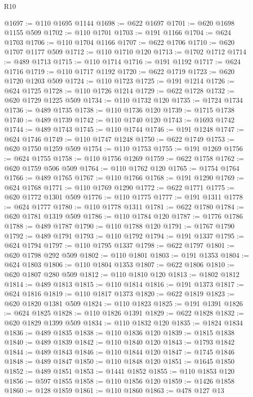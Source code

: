 \begin{lexlean}{R10}
\begin{coremodule}
@1697 := @110 @1695 @1144
@1698 := @622 @1697
@1701 := @620 @1698 @1155 @509
@1702 := @110 @1701
@1703 := @191 @1166
@1704 := @624 @1703
@1706 := @110 @1704 @1166
@1707 := @622 @1706
@1710 := @620 @1707 @1177 @509
@1712 := @110 @1710 @120
@1713 := @1702 @1712
@1714 := @489 @1713
@1715 := @110 @1714
@1716 := @191 @1192
@1717 := @624 @1716
@1719 := @110 @1717 @1192
@1720 := @622 @1719
@1723 := @620 @1720 @1203 @509
@1724 := @110 @1723
@1725 := @191 @1214
@1726 := @624 @1725
@1728 := @110 @1726 @1214
@1729 := @622 @1728
@1732 := @620 @1729 @1225 @509
@1734 := @110 @1732 @120
@1735 := @1724 @1734
@1736 := @489 @1735
@1738 := @110 @1736 @120
@1739 := @1715 @1738
@1740 := @489 @1739
@1742 := @110 @1740 @120
@1743 := @1693 @1742
@1744 := @489 @1743
@1745 := @110 @1744
@1746 := @191 @1248
@1747 := @624 @1746
@1749 := @110 @1747 @1248
@1750 := @622 @1749
@1753 := @620 @1750 @1259 @509
@1754 := @110 @1753
@1755 := @191 @1269
@1756 := @624 @1755
@1758 := @110 @1756 @1269
@1759 := @622 @1758
@1762 := @620 @1759 @506 @509
@1764 := @110 @1762 @120
@1765 := @1754 @1764
@1766 := @489 @1765
@1767 := @110 @1766
@1768 := @191 @1290
@1769 := @624 @1768
@1771 := @110 @1769 @1290
@1772 := @622 @1771
@1775 := @620 @1772 @1301 @509
@1776 := @110 @1775
@1777 := @191 @1311
@1778 := @624 @1777
@1780 := @110 @1778 @1311
@1781 := @622 @1780
@1784 := @620 @1781 @1319 @509
@1786 := @110 @1784 @120
@1787 := @1776 @1786
@1788 := @489 @1787
@1790 := @110 @1788 @120
@1791 := @1767 @1790
@1792 := @489 @1791
@1793 := @110 @1792
@1794 := @191 @1337
@1795 := @624 @1794
@1797 := @110 @1795 @1337
@1798 := @622 @1797
@1801 := @620 @1798 @292 @509
@1802 := @110 @1801
@1803 := @191 @1353
@1804 := @624 @1803
@1806 := @110 @1804 @1353
@1807 := @622 @1806
@1810 := @620 @1807 @280 @509
@1812 := @110 @1810 @120
@1813 := @1802 @1812
@1814 := @489 @1813
@1815 := @110 @1814
@1816 := @191 @1373
@1817 := @624 @1816
@1819 := @110 @1817 @1373
@1820 := @622 @1819
@1823 := @620 @1820 @1381 @509
@1824 := @110 @1823
@1825 := @191 @1391
@1826 := @624 @1825
@1828 := @110 @1826 @1391
@1829 := @622 @1828
@1832 := @620 @1829 @1399 @509
@1834 := @110 @1832 @120
@1835 := @1824 @1834
@1836 := @489 @1835
@1838 := @110 @1836 @120
@1839 := @1815 @1838
@1840 := @489 @1839
@1842 := @110 @1840 @120
@1843 := @1793 @1842
@1844 := @489 @1843
@1846 := @110 @1844 @120
@1847 := @1745 @1846
@1848 := @489 @1847
@1850 := @110 @1848 @120
@1851 := @1645 @1850
@1852 := @489 @1851
@1853 := @1441 @1852
@1855 := @110 @1853 @120
@1856 := @597 @1855
@1858 := @110 @1856 @120
@1859 := @1426 @1858
@1860 := @128 @1859
@1861 := @110 @1860
@1863 := @478 @127 @13

\end{coremodule}
\end{lexlean}
